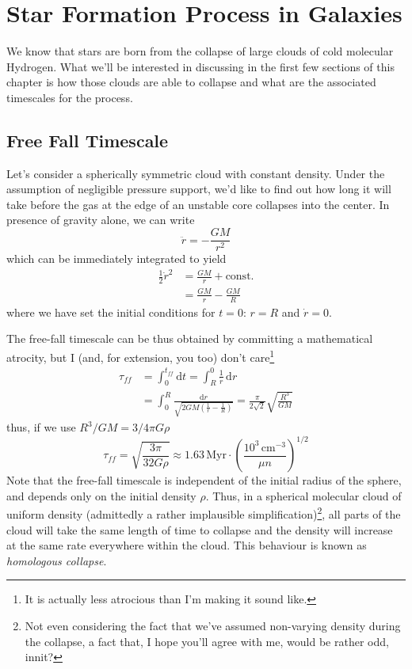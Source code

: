 \chapter{Star Formation Process in Galaxies}\label{ch:v}

We know that stars are born from the collapse of large clouds of cold molecular Hydrogen. What we'll be interested in discussing in the first few sections of this chapter is how those clouds are able to collapse and what are the associated timescales for the process.

\section{Free Fall Timescale}
Let's consider a spherically symmetric cloud with constant density. Under the assumption of negligible pressure support, we'd like to find out how long it will take before the gas at the edge of an unstable core collapses into the center. In presence of gravity alone, we can write 
\begin{equation*}
	\ddot{r} = -\frac{GM}{r^{2}}
\end{equation*}
which can be immediately integrated to yield 
\begin{align*}
    \frac{1}{2}\dot{r}^{2} &= \frac{GM}{r}+\text{const.}\\
    &= \frac{GM}{r}-\frac{GM}{R}
\end{align*}
where we have set the initial conditions for $t=0$: $r=R$ and $\dot{r} = 0$.
\par The free-fall timescale can be thus obtained by committing a mathematical atrocity, but I (and, for extension, you too) don't care\footnote{It is actually less atrocious than I'm making it sound like.}
\begin{align*}
    \tau_{ff} &= \int_{0}^{t_{ff}} \text{d}t = \int_{R}^{0}\frac{1}{\dot{r}}\,\text{d}r \\
    &= \int_{0}^{R} \frac{\text{d}r}{\sqrt{2GM\left(\frac{1}{r}-\frac{1}{R}\right)}} = \frac{\pi}{2\sqrt{2}}\sqrt{\frac{R^{3}}{GM}}
\end{align*}
thus, if we use $R^{3}/GM = 3/4\pi G\rho$
\begin{equation}
    \tau_{ff} = \sqrt{\frac{3\pi}{32G\rho}} \approx 1.63\,\text{Myr}\cdot\left(\frac{10^{3}\,\text{cm}^{-3}}{\mu n}\right)^{1/2}
    \label{eq:ff_timescale}
\end{equation}
Note that the free-fall timescale is independent of the initial radius of the sphere, and depends only on the initial density $\rho$. Thus, in a spherical molecular cloud of uniform density (admittedly a rather implausible simplification)\footnote{Not even considering the fact that we've assumed non-varying density during the collapse, a fact that, I hope you'll agree with me, would be rather odd, innit?}, all parts of the cloud will take the same length of time to collapse and the density will increase at the same rate everywhere within the cloud. This behaviour is known as \emph{homologous collapse}.
